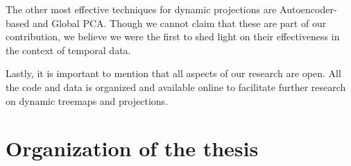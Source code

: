 The other most effective techniques for dynamic projections are Autoencoder-based and Global PCA. Though we cannot claim that these are part of our contribution, we believe we were the first to shed light on their effectiveness in the context of temporal data.  

\bigbreak

Lastly, it is important to mention that all aspects of our research are open. All the code and data is organized and available online to facilitate further research on dynamic treemaps and projections. 

\section{Organization of the thesis}




